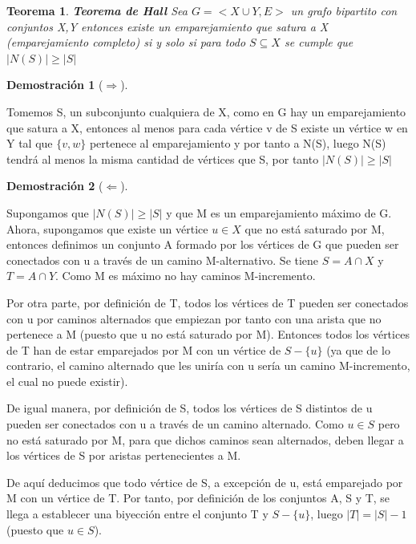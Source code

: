 \documentclass[a4paper,1pt]{report}
\newtheorem*{teo}{Teorema}
\newtheorem*{dem}{Demostración}
\begin{document}
\begin{teo}
 \textbf{Teorema de Hall} Sea $G=<X\cup Y, E>$ un grafo bipartito con conjuntos X,Y entonces existe un emparejamiento que satura a X (emparejamiento completo) si y solo si para todo $S\subseteq X$ se cumple que $|N(S)|\geq |S|$
\end{teo}

\begin{dem}[$\Rightarrow$]
 
\end{dem}

Tomemos S, un subconjunto cualquiera de X, como en G hay un emparejamiento que satura a X, entonces al menos para cada vértice v de S existe un vértice w en Y tal que $\{v,w\}$ pertenece al emparejamiento y por tanto a N(S), luego N(S) tendrá al menos la misma cantidad de vértices que S, por tanto $|N(S)|\geq |S|$\\


\begin{dem}[$\Leftarrow$]
 
\end{dem}

Supongamos que $|N(S)|\geq |S|$ y que M es un emparejamiento máximo de G. Ahora, supongamos que existe un vértice $u\in X$ que no está saturado por M, entonces definimos un conjunto A formado por los vértices de G que pueden ser conectados con u a través de un camino M-alternativo. Se tiene $S=A\cap X$ y $T=A\cap Y$. Como M es máximo no hay caminos M-incremento. 

Por otra parte, por definición de T, todos los vértices de T pueden ser conectados con u por caminos alternados que empiezan por tanto con una arista que no pertenece a M (puesto que u no está saturado por M). Entonces todos los vértices de T han de estar emparejados por M con un vértice de $S- \{u\}$ (ya que de lo contrario, el camino alternado que les uniría con u sería un camino M-incremento, el cual no puede existir).

De igual manera, por definición de S, todos los vértices de S distintos de u pueden ser conectados con u a través de un camino alternado.  Como $u\in S$ pero no está saturado por M, para que dichos caminos sean alternados, deben llegar a los vértices de S por aristas pertenecientes a M.

De aquí deducimos que todo vértice de S, a excepción de u, está emparejado por M con un vértice de T. Por tanto, por definición de los conjuntos A, S y T, se llega a establecer una biyección entre el conjunto T y $S-\{ u \}$, luego $|T| = |S| - 1$ (puesto que $u \in S$).
\end{document}
